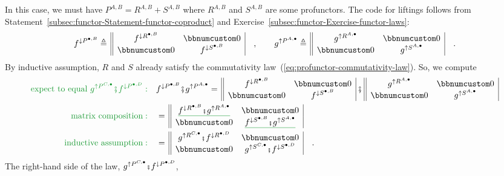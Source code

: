 In this case, we must have $P^{A,B}=R^{A,B}+S^{A,B}$ where $R^{A,B}$
and $S^{A,B}$ are some profunctors. The code for liftings follows
from Statement~\ref{subsec:functor-Statement-functor-coproduct}
and Exercise~\ref{subsec:functor-Exercise-functor-laws}:
\[
f^{\downarrow P^{\bullet,B}}\triangleq\,\begin{array}{||cc|}
f^{\downarrow R^{\bullet,B}} & \bbnum 0\\
\bbnum 0 & f^{\downarrow S^{\bullet,B}}
\end{array}\quad,\quad\quad g^{\uparrow P^{A,\bullet}}\triangleq\,\begin{array}{||cc|}
g^{\uparrow R^{A,\bullet}} & \bbnum 0\\
\bbnum 0 & g^{\uparrow S^{A,\bullet}}
\end{array}\quad.
\]
By inductive assumption, $R$ and $S$ already satisfy the commutativity
law~(\ref{eq:profunctor-commutativity-law}). So, we compute
\begin{align*}
{\color{greenunder}\text{expect to equal }g^{\uparrow P^{C,\bullet}}\bef f^{\downarrow P^{\bullet,D}}:}\quad & f^{\downarrow P^{\bullet,B}}\bef g^{\uparrow P^{A,\bullet}}=\,\begin{array}{||cc|}
f^{\downarrow R^{\bullet,B}} & \bbnum 0\\
\bbnum 0 & f^{\downarrow S^{\bullet,B}}
\end{array}\,\bef\,\begin{array}{||cc|}
g^{\uparrow R^{A,\bullet}} & \bbnum 0\\
\bbnum 0 & g^{\uparrow S^{A,\bullet}}
\end{array}\\
{\color{greenunder}\text{matrix composition}:}\quad & =\,\begin{array}{||cc|}
\gunderline{f^{\downarrow R^{\bullet,B}}\bef g^{\uparrow R^{A,\bullet}}} & \bbnum 0\\
\bbnum 0 & \gunderline{f^{\downarrow S^{\bullet,B}}\bef g^{\uparrow S^{A,\bullet}}}
\end{array}\\
{\color{greenunder}\text{inductive assumption}:}\quad & =\,\begin{array}{||cc|}
g^{\uparrow R^{C,\bullet}}\bef f^{\downarrow R^{\bullet,D}} & \bbnum 0\\
\bbnum 0 & g^{\uparrow S^{C,\bullet}}\bef f^{\downarrow S^{\bullet,D}}
\end{array}\quad.
\end{align*}
The right-hand side of the law, $g^{\uparrow P^{C,\bullet}}\bef f^{\downarrow P^{\bullet,D}}$,
